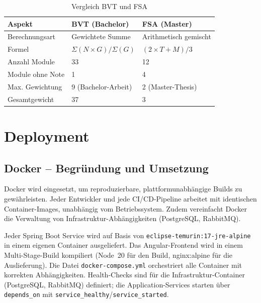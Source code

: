 \documentclass[12pt,a4paper,ngerman]{article}
\begin{document}
\begin{table}[H]
\centering
\caption{Vergleich BVT und FSA}
\begin{tabular}{lll}
\toprule
\textbf{Aspekt} & \textbf{BVT (Bachelor)} & \textbf{FSA (Master)} \\
\midrule
Berechnungsart     & Gewichtete Summe      & Arithmetisch gemischt \\
Formel             & $\Sigma(N \times G) / \Sigma(G)$ & $(2 \times T + M) / 3$ \\
Anzahl Module      & 33                    & 12 \\
Module ohne Note   & 1                     & 4 \\
Max. Gewichtung    & 9 (Bachelor-Arbeit)   & 2 (Master-Thesis) \\
Gesamtgewicht      & 37                    & 3 \\
\bottomrule
\end{tabular}
\end{table}

\section{Deployment}

\subsection{Docker -- Begründung und Umsetzung}

Docker wird eingesetzt, um reproduzierbare, plattformunabhängige Builds zu gewährleisten. Jeder Entwickler und jede CI/CD-Pipeline arbeitet mit identischen Container-Images, unabhängig vom Betriebssystem. Zudem vereinfacht Docker die Verwaltung von Infrastruktur-Abhängigkeiten (PostgreSQL, RabbitMQ).

Jeder Spring Boot Service wird auf Basis von \texttt{eclipse-temurin:17-jre-alpine} in einem eigenen Container ausgeliefert. Das Angular-Frontend wird in einem Multi-Stage-Build kompiliert (Node~20 für den Build, nginx:alpine für die Auslieferung). Die Datei \texttt{docker-compose.yml} orchestriert alle Container mit korrekten Abhängigkeiten. Health-Checks sind für die Infrastruktur-Container (PostgreSQL, RabbitMQ) definiert; die Application-Services starten über \texttt{depends\_on} mit \texttt{service\_healthy}/\texttt{service\_started}.
\end{document}
